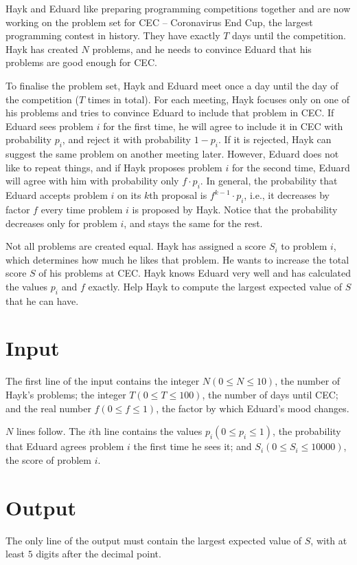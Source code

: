 Hayk and Eduard like preparing programming competitions together and are now working on the problem set for CEC -- Coronavirus End Cup, the largest programming contest in history.
They have exactly $T$ days until the competition.
Hayk has created $N$ problems, and he needs to convince Eduard that his problems are good enough for CEC.

To finalise the problem set, Hayk and Eduard meet once a day until the day of the competition ($T$ times in total).
For each meeting, Hayk focuses only on one of his problems and 
tries to convince Eduard to include that problem in CEC.
If Eduard sees problem $i$ for the first time, he will agree to include it in CEC with probability $p_i$, and reject it with probability $1 - p_i$.
If it is rejected, Hayk can suggest the same problem on another meeting later.
However, Eduard does not like to repeat things, and if Hayk proposes problem $i$
for the second time, Eduard will agree with him with probability only $f \cdot p_i$.
In general, the probability that Eduard accepts problem $i$ on its $k$th proposal is $f^{k-1}\cdot p_i$, i.e., it decreases by factor $f$ every time problem $i$ is proposed by Hayk.
Notice that the probability decreases only for problem $i$, and stays the same for the rest.

Not all problems are created equal.
Hayk has assigned a score $S_i$ to problem $i$, which determines how much he likes that problem.
He wants to increase the total score $S$ of his problems at CEC.
Hayk knows Eduard very well and has calculated the values $p_i$ and $f$ exactly.
Help Hayk to compute the largest expected value of $S$ that he can have.

\section*{Input}
The first line of the input contains the integer $N (0 \leq N \leq 10)$, the number of Hayk's problems; the integer $T (0 \leq T \leq 100)$, the number of days until CEC; and the real number $f (0 \leq f \leq 1)$, the factor by which Eduard's mood changes.

$N$ lines follow.
The $i$th line contains the values $p_i (0 \leq p_i \leq 1)$, the probability that
Eduard agrees problem $i$ the first time he sees it;
and $S_i (0 \leq S_i \leq 10000)$, the score of problem $i$.

\section*{Output}
The only line of the output must contain the largest expected value of $S$, with at least $5$ digits after the decimal point.
